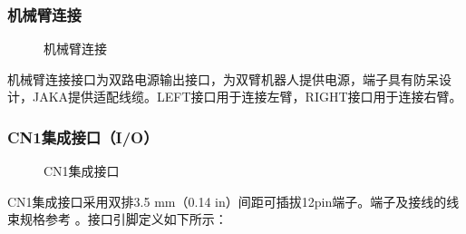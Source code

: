 \documentclass[a4paper,11pt,english,openany,oneside]{sphinxmanual}
\begin{document}
\subsubsection{机械臂连接}
\label{\detokenize{08 _u5b89_u88c5_u4e0e_u8c03_u8bd5:id66}}\label{\detokenize{08 _u5b89_u88c5_u4e0e_u8c03_u8bd5:id67}}
\begin{figure}[H]
\centering
\capstart

\noindent{}
\caption{机械臂连接}\label{\detokenize{08 _u5b89_u88c5_u4e0e_u8c03_u8bd5:id115}}\end{figure}



\sphinxAtStartPar
机械臂连接接口为双路电源输出接口，为双臂机器人提供电源，端子具有防呆设计，JAKA提供适配线缆。LEFT接口用于连接左臂，RIGHT接口用于连接右臂。


\subsubsection{CN1集成接口（I/O）}
\label{\detokenize{08 _u5b89_u88c5_u4e0e_u8c03_u8bd5:cn1-i-o}}\label{\detokenize{08 _u5b89_u88c5_u4e0e_u8c03_u8bd5:id68}}
\begin{figure}[H]
\centering
\capstart

\noindent{}
\caption{CN1集成接口}\label{\detokenize{08 _u5b89_u88c5_u4e0e_u8c03_u8bd5:id116}}\end{figure}



\sphinxAtStartPar
CN1集成接口采用双排3.5 mm（0.14 in）间距可插拔12pin端子。端子及接线的线束规格参考 {\hyperref[\detokenize{07 _u6280_u672f_u89c4_u683c:id9}]{}} 。接口引脚定义如下所示：
\end{document}

